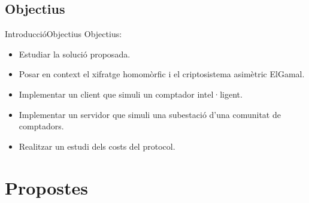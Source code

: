 \documentclass{beamer}
\begin{document}
\subsection{Objectius}
\begin{frame}{Introducció}{Objectius}
	Objectius:
	\begin{itemize}
		\item Estudiar la solució proposada.
		\item Posar en context el xifratge homomòrfic i el criptosistema asimètric ElGamal.
		\item Implementar un client que simuli un comptador intel·ligent.
		\item Implementar un servidor que simuli una subestació d'una comunitat de comptadors.
		\item Realitzar un estudi dels costs del protocol.
	\end{itemize}
\end{frame}

\section{Propostes}
\end{document}
